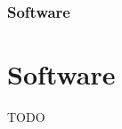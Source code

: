 
\begin{frame}

    \frametitle{Software}
    \section{Software}\label{sec:software}

    TODO


\end{frame}